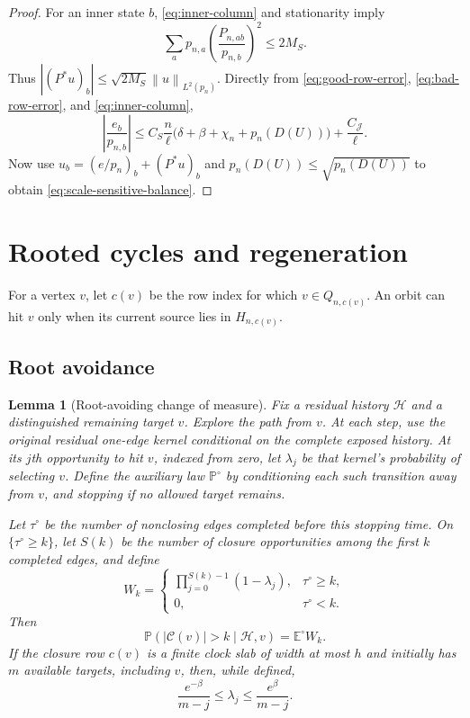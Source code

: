 \documentclass[11pt]{article}
\newtheorem{lemma}[theorem]{Lemma}
\theoremstyle{definition}
\theoremstyle{remark}
\newcommand{\Pp}{\mathbb P}
\newcommand{\Ee}{\mathbb E}
\newcommand{\cH}{\mathcal H}
\newcommand{\cJ}{\mathcal J}
\newcommand{\cC}{\mathcal C}
\newcommand{\norm}[1]{\left\lVert#1\right\rVert}
\begin{document}
\begin{proof}
For an inner state $b$, \eqref{eq:inner-column} and stationarity imply
\[
 \sum_ap_{n,a}\left(\frac{P_{n,ab}}{p_{n,b}}\right)^2
 \le 2M_S.
\]
Thus $|(P^*u)_b|\le\sqrt{2M_S}\norm{u}_{L^2(p_n)}$.  Directly from
\eqref{eq:good-row-error}, \eqref{eq:bad-row-error}, and
\eqref{eq:inner-column},
\[
 \left|\frac{e_b}{p_{n,b}}\right|
 \le C_S\frac n\ell
 \bigl(\delta+\beta+\chi_n+p_n(D(U))\bigr)
 +\frac{C_{\cJ}}\ell.
\]
Now use $u_b=(e/p_n)_b+(P^*u)_b$ and
$p_n(D(U))\le\sqrt{p_n(D(U))}$ to obtain
\eqref{eq:scale-sensitive-balance}.
\end{proof}

\section{Rooted cycles and regeneration}
\label{sec:rooted}

For a vertex $v$, let $c(v)$ be the row index for which $v\in Q_{n,c(v)}$.
An orbit can hit $v$ only when its current source lies in $H_{n,c(v)}$.

\subsection{Root avoidance}

\begin{lemma}[Root-avoiding change of measure]
\label{lem:root-avoiding}
Fix a residual history $\cH$ and a distinguished remaining target $v$.
Explore the path from $v$.  At each step, use the original residual one-edge
kernel conditional on the complete exposed history.  At its $j$th opportunity
to hit $v$, indexed from zero, let $\lambda_j$ be that kernel's probability of
selecting $v$.  Define the auxiliary law $\Pp^\circ$ by conditioning each such
transition away from $v$, and stopping if no allowed target remains.

Let $\tau^\circ$ be the number of nonclosing edges completed before this
stopping time.  On $\{\tau^\circ\ge k\}$, let $S(k)$ be the number of closure
opportunities among the first $k$ completed edges, and define
\begin{equation}
 W_k=
 \begin{cases}
  \displaystyle\prod_{j=0}^{S(k)-1}(1-\lambda_j),
       &\tau^\circ\ge k,\\[1ex]
  0,   &\tau^\circ<k.
 \end{cases}
 \label{eq:root-survival-weight}
\end{equation}
Then
\begin{equation}
 \Pp(|\cC(v)|>k\mid\cH,v)
 =\Ee^\circ W_k.
 \label{eq:root-rn}
\end{equation}
If the closure row $c(v)$ is a finite clock slab of width at most $h$ and
initially has $m$ available targets, including $v$, then, while defined,
\begin{equation}
 \frac{e^{-\beta}}{m-j}\le\lambda_j\le
 \frac{e^\beta}{m-j}.
 \label{eq:root-hazard}
\end{equation}
\end{lemma}
\end{document}
